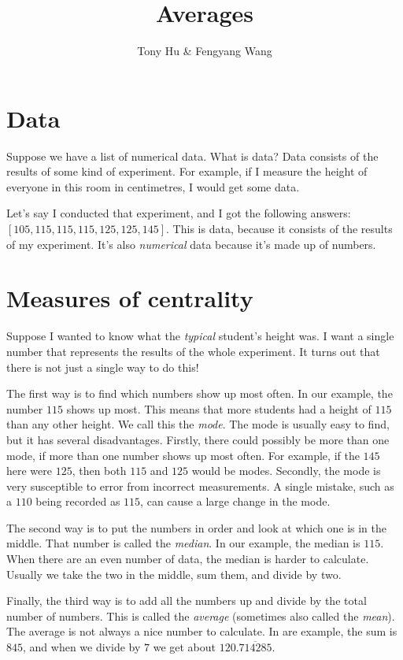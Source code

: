 \documentclass[letterpaper,10pt]{article}
\title{Averages}
\author{Tony Hu \& Fengyang Wang}
\begin{document}
\maketitle

\section{Data}

Suppose we have a list of numerical data. What is data? Data 
consists of the results of some kind of experiment. For
example, if I measure the height of everyone in this room
in centimetres, I would get some data.

Let's say I conducted that experiment, and I got the following
answers: $[105, 115, 115, 115, 125, 125, 145]$. This is
data, because it consists of the results of my experiment.
It's also \emph{numerical} data because it's made up of
numbers.

\section{Measures of centrality}

Suppose I wanted to know what the \emph{typical} student's
height was. I want a single number that represents the 
results of the whole experiment. It turns out that there
is not just a single way to do this!

The first way is to find which numbers show up most often.
In our example, the number $115$ shows up most. This means
that more students had a height of $115$ than any other
height. We call this the \emph{mode}. The mode is usually
easy to find, but it has several disadvantages. Firstly,
there could possibly be more than one mode, if more than
one number shows up most often. For example, if the $145$
here were $125$, then both $115$ and $125$ would be modes.
Secondly, the mode is very susceptible to error from
incorrect measurements. A single mistake, such as a $110$
being recorded as $115$, can cause a large change in the
mode.

The second way is to put the numbers in order and look
at which one is in the middle. That number is called the
\emph{median}. In our example, the median is $115$.
When there are an even number of data, the median is harder
to calculate. Usually we take the two in the middle,
sum them, and divide by two.

Finally, the third way is to add all the numbers up and
divide by the total number of numbers. This is called the
\emph{average} (sometimes also called the \emph{mean}).
The average is not always a nice number to calculate.
In are example, the sum is $845$, and when we divide by
$7$ we get about $120.\overline{714285}$.
\end{document}
